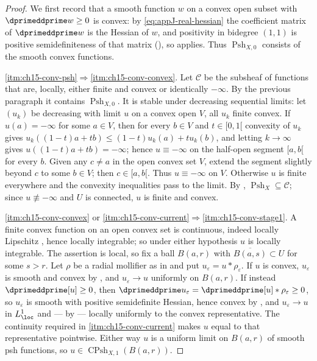 \begin{proof}
We first record that a smooth function $w$ on a convex open subset with
$\dprimeddprime w\ge0$ is convex: by \eqref{eq:appJ-real-hessian} the
coefficient matrix of $\dprimeddprime w$ is the Hessian of $w$, and
positivity in bidegree $(1,1)$ is positive semidefiniteness of that matrix
(), so
 applies.  Thus
$\operatorname{Psh}_{X,0}$ consists of the smooth convex functions.

\cref{itm:ch15-conv-psh}$\Rightarrow$\cref{itm:ch15-conv-convex}.  Let
$\mathscr C$ be the subsheaf of functions that are, locally, either finite
and convex or identically $-\infty$.  By the previous paragraph it contains
$\operatorname{Psh}_{X,0}$.  It is stable under decreasing sequential limits:
let $(u_k)$ be decreasing with limit $u$ on a convex open $V$, all $u_k$
finite convex.  If $u(a)=-\infty$ for some $a\in V$, then for every $b\in V$
and $t\in[0,1[$ convexity of $u_k$ gives
$u_k((1-t)a+tb)\le(1-t)u_k(a)+tu_k(b)$, and letting $k\to\infty$ gives
$u((1-t)a+tb)=-\infty$; hence $u\equiv-\infty$ on the half-open segment
$[a,b[$ for every $b$.  Given any $c\ne a$ in the open convex set $V$,
extend the segment slightly beyond $c$ to some $b\in V$; then $c\in[a,b[$.
Thus $u\equiv-\infty$ on $V$.  Otherwise $u$ is finite
everywhere and the convexity inequalities pass to the limit.  By
, $\operatorname{Psh}_X\subseteq\mathscr C$; since
$u\not\equiv-\infty$ and $U$ is connected, $u$ is finite and convex.

\cref{itm:ch15-conv-convex} or
\cref{itm:ch15-conv-current}$\Rightarrow$\cref{itm:ch15-conv-stage1}.  A finite
convex function on an open convex set is continuous, indeed locally Lipschitz
\cite[\S10]{Roc70}, hence locally integrable; so under either hypothesis $u$
is locally integrable.  The assertion is local, so fix a ball $B(a,r)$ with
$\overline{B(a,s)}\subset U$ for some $s>r$.  Let $\rho$ be a radial
mollifier as in  and put
$u_\varepsilon=u*\rho_\varepsilon$.  If $u$ is convex, $u_\varepsilon$ is
smooth and convex by , and
$u_\varepsilon\to u$ uniformly on $B(a,r)$.  If instead
$\dprimeddprime[u]\ge0$, then
$\dprimeddprime u_\varepsilon=\dprimeddprime[u]*\rho_\varepsilon\ge0$, so
$u_\varepsilon$ is smooth with positive semidefinite Hessian, hence convex by
, and $u_\varepsilon\to u$ in $L^1_{\loc}$ and
--- by  --- locally uniformly to
the convex representative.  The continuity required in
\cref{itm:ch15-conv-current} makes $u$ equal to that representative
pointwise.  Either way $u$ is a uniform limit on
$B(a,r)$ of smooth psh functions, so
$u\in\operatorname{CPsh}_{X,1}(B(a,r))$.


\end{proof}
